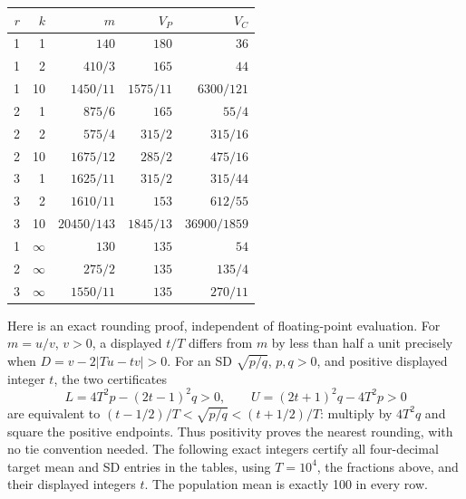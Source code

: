 \begin{center}\small
\begin{tabular}{rr r r r}
\toprule
\(r\)&\(k\)&\(m\)&\(V_P\)&\(V_C\)\\\midrule
1&1&\(140\)&\(180\)&\(36\)\\
1&2&\(410/3\)&\(165\)&\(44\)\\
1&10&\(1450/11\)&\(1575/11\)&\(6300/121\)\\
2&1&\(875/6\)&\(165\)&\(55/4\)\\
2&2&\(575/4\)&\(315/2\)&\(315/16\)\\
2&10&\(1675/12\)&\(285/2\)&\(475/16\)\\
3&1&\(1625/11\)&\(315/2\)&\(315/44\)\\
3&2&\(1610/11\)&\(153\)&\(612/55\)\\
3&10&\(20450/143\)&\(1845/13\)&\(36900/1859\)\\\midrule
1&\(\infty\)&\(130\)&\(135\)&\(54\)\\
2&\(\infty\)&\(275/2\)&\(135\)&\(135/4\)\\
3&\(\infty\)&\(1550/11\)&\(135\)&\(270/11\)\\\bottomrule
\end{tabular}
\end{center}

Here is an exact rounding proof, independent of floating-point evaluation.
For \(m=u/v\), \(v>0\), a displayed \(t/T\) differs from \(m\)
by less than half a unit precisely when
\(D=v-2|Tu-tv|>0\). For an SD \(\sqrt{p/q}\), \(p,q>0\), and
positive displayed integer \(t\), the two certificates
\[
 L=4T^2p-(2t-1)^2q>0,\qquad
 U=(2t+1)^2q-4T^2p>0
\]
are equivalent to
\((t-1/2)/T<\sqrt{p/q}<(t+1/2)/T\): multiply by \(4T^2q\)
and square the positive endpoints. Thus positivity proves the nearest
rounding, with no tie convention needed. The following exact integers
certify all four-decimal target mean and SD entries in the tables, using
\(T=10^4\), the fractions above, and their displayed integers \(t\).
The population mean is exactly 100 in every row.

